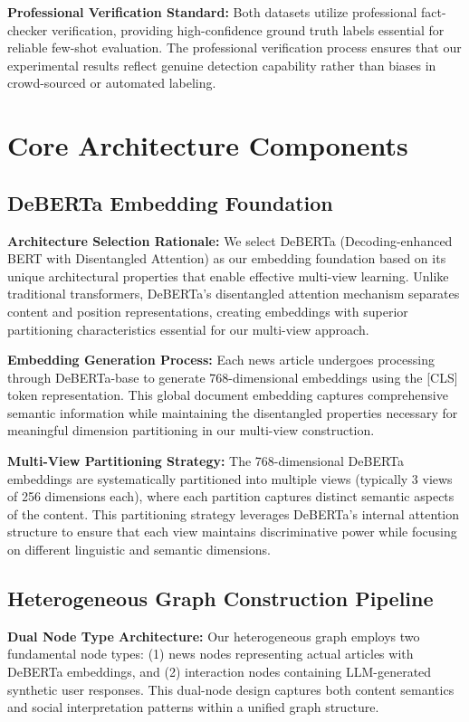 \textbf{Professional Verification Standard:} Both datasets utilize professional fact-checker verification, providing high-confidence ground truth labels essential for reliable few-shot evaluation. The professional verification process ensures that our experimental results reflect genuine detection capability rather than biases in crowd-sourced or automated labeling.

\section{Core Architecture Components}

\subsection{DeBERTa Embedding Foundation}

\textbf{Architecture Selection Rationale:} We select DeBERTa (Decoding-enhanced BERT with Disentangled Attention) as our embedding foundation based on its unique architectural properties that enable effective multi-view learning. Unlike traditional transformers, DeBERTa's disentangled attention mechanism separates content and position representations, creating embeddings with superior partitioning characteristics essential for our multi-view approach.

\textbf{Embedding Generation Process:} Each news article undergoes processing through DeBERTa-base to generate 768-dimensional embeddings using the [CLS] token representation. This global document embedding captures comprehensive semantic information while maintaining the disentangled properties necessary for meaningful dimension partitioning in our multi-view construction.

\textbf{Multi-View Partitioning Strategy:} The 768-dimensional DeBERTa embeddings are systematically partitioned into multiple views (typically 3 views of 256 dimensions each), where each partition captures distinct semantic aspects of the content. This partitioning strategy leverages DeBERTa's internal attention structure to ensure that each view maintains discriminative power while focusing on different linguistic and semantic dimensions.

\subsection{Heterogeneous Graph Construction Pipeline}

\textbf{Dual Node Type Architecture:} Our heterogeneous graph employs two fundamental node types: (1) news nodes representing actual articles with DeBERTa embeddings, and (2) interaction nodes containing LLM-generated synthetic user responses. This dual-node design captures both content semantics and social interpretation patterns within a unified graph structure.

